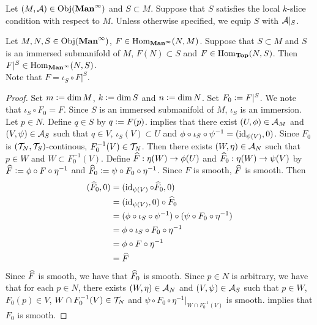 \documentclass{book}
\begin{document}
	\begin{note}
		Let $(M, \mathcal{A}) \in \operatorname{Obj}(\operatorname*{\text{\textbf{Man}}^{\infty}})$ and $S \subset M$. Suppose that $S$ satisfies the local $k$-slice condition with respect to $M$. Unless otherwise specified, we equip $S$ with $\mathcal{A}|_S$.
	\end{note}

	\begin{ex} 
		Let $M, N, S \in \operatorname{Obj}(\operatorname*{\text{\textbf{Man}}^{\infty}})$, $F \in \operatorname{Hom}_{\operatorname*{\text{\textbf{Man}}^{\infty}}}(N, M)$. Suppose that $S \subset M$ and $S$ is an immersed submanifold of $M$, $F(N) \subset S$ and $F \in \operatorname{Hom}_{\operatorname*{\text{\textbf{Top}}}}(N, S)$. Then $F|^S \in \operatorname{Hom}_{\operatorname*{\text{\textbf{Man}}^{\infty}}}(N, S)$. \\
		 Note that $F = \iota_S \circ F|^S$.
	\end{ex}

	\begin{proof}
		Set $m \vcentcolon= \dim M$, $k \vcentcolon= \dim S$ and $n \vcentcolon= \dim N$. Set $F_0 \vcentcolon= F|^S$. We note that $\iota_S \circ F_0 = F$. Since $S$ is an immersed submanifold of $M$, $\iota_S$ is an immersion. Let $p \in N$. Define $q \in S$ by $q \vcentcolon= F(p)$.  implies that there exist $(U, \phi) \in \mathcal{A}_M$ and $(V, \psi) \in \mathcal{A}_S$ such that $q \in V$, $\iota_S(V) \subset U$ and $\phi \circ \iota_S \circ \psi^{-1} = (\operatorname{id}_{\psi(V)}, 0)$. Since $F_0$ is $(\mathcal{T}_N, \mathcal{T}_S)$-continous, $F_0^{-1}(V) \in \mathcal{T}_N$. Then there exists $(W, \eta) \in \mathcal{A}_N$ such that $p \in W$ and $W \subset F_0^{-1}(V)$. Define $\widehat{F}: \eta(W) \rightarrow \phi(U)$ and $\widehat{F}_0: \eta(W) \rightarrow \psi(V)$ by $\widehat{F} \vcentcolon= \phi \circ F \circ \eta^{-1}$ and $\widehat{F}_0 \vcentcolon= \psi \circ F_0 \circ \eta^{-1}$. Since $F$ is smooth, $\widehat{F}$ is smooth. Then 
		\begin{align*}
			(\widehat{F}_0, 0)
			& = (\operatorname{id}_{\psi(V)} \circ \widehat{F}_0, 0) \\
			& = (\operatorname{id}_{\psi(V)}, 0) \circ \widehat{F}_0 \\
			& = (\phi \circ \iota_S \circ \psi^{-1}) \circ (\psi \circ F_0 \circ \eta^{-1}) \\
			& = \phi \circ \iota_S \circ F_0 \circ \eta^{-1} \\
			& = \phi \circ F \circ \eta^{-1} \\
			& = \widehat{F} 
		\end{align*}
		Since $\widehat{F}$ is smooth, we have that $\widehat{F}_0$ is smooth. Since $p \in N$ is arbitrary, we have that for each $p \in N$, there exists $(W, \eta) \in \mathcal{A}_N$ and $(V, \psi) \in \mathcal{A}_S$ such that $p \in W$, $F_0(p) \in V$, $W \cap F_0^{-1}(V) \in \mathcal{T}_N$ and $\psi \circ F_0 \circ \eta^{-1}|_{W \cap F_0^{-1}(V)}$ is smooth.  implies that $F_0$ is smooth. 
	\end{proof}
\end{document}
